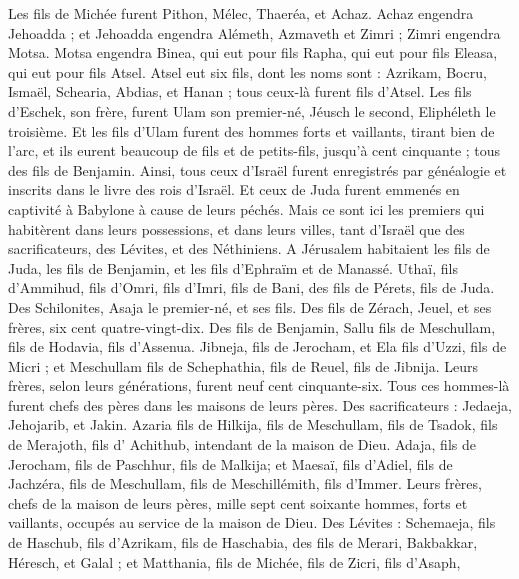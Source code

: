 \begin{multicols}{2}
Les fils de Michée furent Pithon, Mélec, Thaeréa, et Achaz.
Achaz engendra Jehoadda ; et Jehoadda engendra Alémeth, Azmaveth et Zimri ; Zimri engendra Motsa.
Motsa engendra Binea, qui eut pour fils Rapha, qui eut pour fils Eleasa, qui eut pour fils Atsel.
Atsel eut six fils, dont les noms sont : Azrikam, Bocru, Ismaël, Schearia, Abdias, et Hanan ; tous ceux-là furent fils d'Atsel.
Les fils d'Eschek, son frère, furent  Ulam son premier-né, Jéusch le second, Eliphéleth le troisième.
Et les fils d'Ulam furent des hommes forts et vaillants, tirant bien de l'arc, et ils eurent beaucoup de fils et de petits-fils, jusqu'à cent cinquante ; tous des fils de Benjamin.
\VerseOne{}Ainsi, tous ceux d'Israël furent enregistrés par généalogie et inscrits dans le livre des rois d'Israël. Et ceux de Juda furent emmenés en captivité à Babylone à cause de leurs péchés.
Mais ce sont ici les premiers qui habitèrent dans leurs possessions, et dans leurs villes, tant d'Israël que des sacrificateurs, des Lévites, et des Néthiniens.
A Jérusalem habitaient les fils de Juda, les fils de Benjamin, et les fils d'Ephraïm et de Manassé.
Uthaï, fils d'Ammihud, fils d'Omri, fils d'Imri, fils de Bani, des fils de Pérets, fils de Juda.
Des Schilonites, Asaja le premier-né, et ses fils.
Des fils de Zérach, Jeuel, et ses frères, six cent quatre-vingt-dix.
Des fils de Benjamin, Sallu fils de Meschullam, fils de Hodavia, fils d'Assenua.
Jibneja, fils de Jerocham, et Ela fils d’Uzzi, fils de Micri ; et Meschullam fils de Schephathia, fils de Reuel, fils de Jibnija.
Leurs frères, selon leurs générations, furent neuf cent cinquante-six. Tous ces hommes-là furent chefs des pères dans les maisons de leurs  pères.
Des sacrificateurs : Jedaeja, Jehojarib, et Jakin.
Azaria fils de Hilkija, fils de Meschullam, fils de Tsadok, fils de Merajoth, fils d' Achithub, intendant de la maison de Dieu.
Adaja, fils de Jerocham, fils de Paschhur, fils de Malkija; et Maesaï, fils d'Adiel, fils de Jachzéra, fils de Meschullam, fils de Meschillémith, fils d'Immer.
Leurs frères, chefs de la maison de leurs pères, mille sept cent soixante hommes, forts et vaillants, occupés au service de la maison de Dieu.
Des Lévites : Schemaeja, fils de Haschub, fils d'Azrikam, fils de Haschabia, des fils de Merari,
Bakbakkar, Héresch, et Galal ; et Matthania, fils de Michée, fils de Zicri, fils d'Asaph,

\end{multicols}
